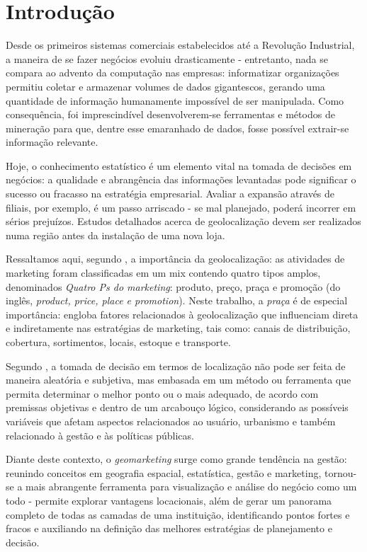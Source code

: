 ﻿
\chapter{Introdução}
\label{introducao}

Desde os primeiros sistemas comerciais estabelecidos até a Revolução Industrial,
a maneira de se fazer negócios evoluiu drasticamente - entretanto, nada se
compara ao advento da computação nas empresas: informatizar
organizações permitiu coletar e armazenar volumes de dados
gigantescos, gerando uma quantidade de informação humanamente impossível de
ser manipulada. Como consequência, foi imprescindível desenvolverem-se ferramentas e
métodos de mineração para que, dentre esse emaranhado de dados, fosse possível extrair-se informação relevante. 

Hoje, o conhecimento estatístico é um elemento vital na tomada de decisões em negócios: a qualidade e abrangência das informações levantadas pode significar o sucesso ou fracasso na estratégia empresarial. Avaliar a expansão através de filiais, por exemplo, é um passo arriscado - se mal planejado, poderá incorrer em sérios prejuízos. Estudos detalhados acerca de geolocalização devem ser realizados numa região antes da instalação de uma nova loja. 

Ressaltamos aqui, segundo , a importância da geolocalização: as atividades de marketing foram classificadas em um mix contendo quatro tipos amplos, denominados \emph{Quatro Ps do marketing}: produto, preço, praça e promoção (do inglês, \emph{product, price, place e promotion}). Neste trabalho, a \emph{praça} é de especial importância: engloba fatores relacionados à geolocalização que influenciam direta e indiretamente nas estratégias de marketing, tais como: canais de distribuição, cobertura, sortimentos, locais, estoque e transporte. 

Segundo , a tomada de decisão em termos de
localização não pode ser feita de maneira aleatória e subjetiva, mas embasada em
um método ou ferramenta que permita determinar o melhor ponto ou o mais
adequado, de acordo com premissas objetivas e dentro de um arcabouço lógico,
considerando as possíveis variáveis que afetam aspectos relacionados ao usuário,
urbanismo e também relacionado à gestão e às políticas públicas. 

Diante deste contexto, o \emph{geomarketing} surge como grande tendência na gestão: reunindo conceitos em geografia espacial, estatística, gestão e marketing, tornou-se a mais abrangente ferramenta para visualização e análise do negócio como um todo - permite explorar vantagens locacionais, além de gerar um panorama completo de todas as camadas de uma instituição, identificando pontos fortes e fracos e auxiliando na definição das melhores estratégias de planejamento e decisão.

